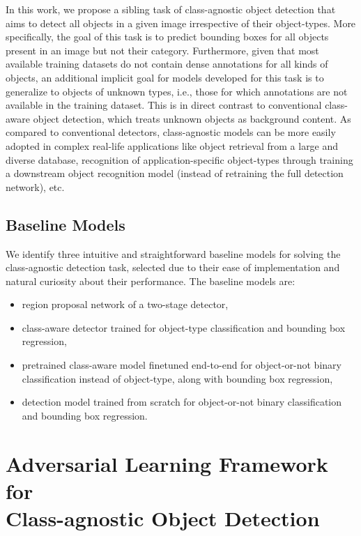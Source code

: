 \documentclass[10pt,twocolumn,letterpaper]{article}
\begin{document}
In this work, we propose a sibling task of class-agnostic object detection that aims to detect all objects in a given image irrespective of their object-types. More specifically, the goal of this task is to predict bounding boxes for all objects present in an image but not their category. Furthermore, given that most available training datasets do not contain dense annotations for all kinds of objects, an additional implicit goal for models developed for this task is to generalize to objects of unknown types, i.e., those for which annotations are not available in the training dataset. This is in direct contrast to conventional class-aware object detection, which treats unknown objects as background content. As compared to conventional detectors, class-agnostic models can be more easily adopted in complex real-life applications like object retrieval from a large and diverse database, recognition of application-specific object-types through training a downstream object recognition model (instead of retraining the full detection network), etc.

\subsection{Baseline Models}

We identify three intuitive and straightforward baseline models for solving the class-agnostic detection task, selected due to their ease of implementation and natural curiosity about their performance. The baseline models are:
\begin{itemize}
    \setlength\itemsep{-0.4em}
    \item region proposal network of a two-stage detector,
    \item class-aware detector trained for object-type classification and bounding box regression,
    \item pretrained class-aware model finetuned end-to-end for object-or-not binary classification instead of object-type, along with bounding box regression,
    \item detection model trained from scratch for object-or-not binary classification and bounding box regression.
\end{itemize}
 \section{Adversarial Learning Framework for \\Class-agnostic Object Detection}
\label{sec:method}
\end{document}
